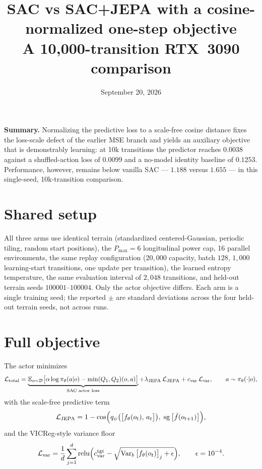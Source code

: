 \documentclass[11pt]{article}
\title{SAC vs SAC+JEPA with a cosine-normalized one-step objective\\[2pt]
\large A 10{,}000-transition RTX~3090 comparison}
\author{}
\date{September 20, 2026}
\begin{document}
\maketitle

\noindent
\textbf{Summary.} Normalizing the predictive loss to a scale-free cosine
distance fixes the loss-scale defect of the earlier MSE branch and yields an
auxiliary objective that is demonstrably learning: at 10k transitions the
predictor reaches $0.0038$ against a shuffled-action loss of $0.0099$ and a
no-model identity baseline of $0.1253$. Performance, however, remains below
vanilla SAC --- $1.188$ versus $1.655$ --- in this single-seed, 10k-transition
comparison.

\section{Shared setup}

All three arms use identical terrain (standardized centered-Gaussian,
periodic tiling, random start positions), the $P_{\max}=6$ longitudinal power
cap, 16 parallel environments, the same replay configuration
($20{,}000$ capacity, batch $128$, $1{,}000$ learning-start transitions, one
update per transition), the learned entropy temperature, the same evaluation
interval of $2{,}048$ transitions, and held-out terrain seeds
$100001$--$100004$. Only the actor objective differs. Each arm is a single
training seed; the reported $\pm$ are standard deviations across the four
held-out terrain seeds, not across runs.

\section{Full objective}

The actor minimizes
\begin{equation}
 \mathcal L_{\rm total}
 =\underbrace{\mathbb E_{o\sim\mathcal D}\big[\alpha\log\pi_\theta(a|o)-\min(Q_1,Q_2)(o,a)\big]}_{\text{SAC actor loss}}
 +\lambda_{\rm JEPA}\,\mathcal L_{\rm JEPA}
 +c_{\rm var}\,\mathcal L_{\rm var},
 \qquad a\sim\pi_\theta(\cdot|o),
\end{equation}
with the scale-free predictive term
\begin{equation}
 \mathcal L_{\rm JEPA}
 =1-\cos\!\Big(q_\psi\big(\big[f_\theta(o_t),\,a_t\big]\big),\;
 \operatorname{sg}\big[\bar f(o_{t+1})\big]\Big),
\end{equation}
and the VICReg-style variance floor
\begin{equation}
 \mathcal L_{\rm var}
 =\frac{1}{d}\sum_{j=1}^{d}\operatorname{relu}\!\Big(c_{\rm var}^{\rm tgt}
 -\sqrt{\operatorname{Var}_{b}\big[f_\theta(o_t)\big]_j+\epsilon}\Big),
 \qquad \epsilon=10^{-4}.
\end{equation}
\end{document}
